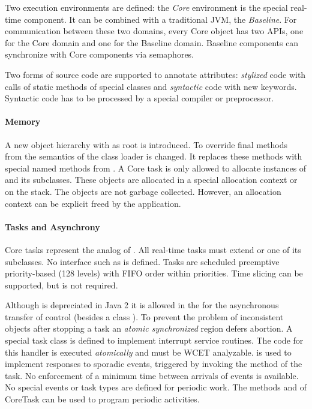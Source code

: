 Two execution environments are defined: the \textit{Core}
environment is the special real-time component. It can be combined
with a traditional JVM, the \textit{Baseline}. For communication
between these two domains, every Core object has two APIs, one for
the Core domain and one for the Baseline domain. Baseline components
can synchronize with Core components via semaphores.

Two forms of source code are supported to annotate attributes:
\textit{stylized} code with calls of static methods of special
classes and \textit{syntactic} code with new keywords. Syntactic
code has to be processed by
a special compiler or preprocessor.

\paragraph{Memory}

A new object hierarchy with  as root is introduced.
To override final methods from  the semantics of the
class loader is changed. It replaces these methods with special
named methods from . A Core task is only allowed to
allocate instances of  and its subclasses. These
objects are allocated in a special allocation context or on the
stack. The objects are not garbage collected. However, an allocation
context can be explicit freed by the application.

\paragraph{Tasks and Asynchrony}

Core tasks represent the analog of . All
real-time tasks must extend  or one of its
subclasses. No interface such as  is
defined. Tasks are scheduled preemptive priority-based (128 levels)
with FIFO order within priorities. Time slicing can be supported,
but is not required.


Although  is depreciated in Java 2 it is allowed in the
 for the asynchronous transfer of control (besides a
class ). To prevent the problem of inconsistent
objects after stopping a task an \textit{atomic synchronized} region
defers abortion. A special task class is defined to implement
interrupt service routines. The code for this handler is executed
\textit{atomically} and must be WCET analyzable. 
is used to implement responses to sporadic events, triggered by
invoking the  method of the task. No enforcement of
a minimum time between arrivals of events is available. No special
events or task types are defined for periodic work. The methods
 and  of CoreTask can be used to
program periodic activities.


